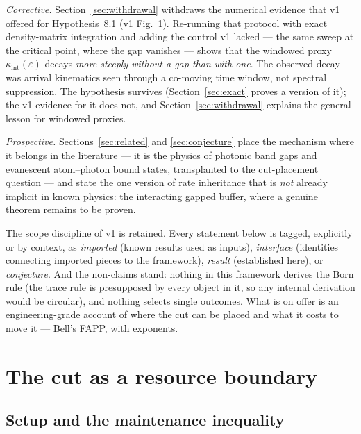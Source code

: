 \documentclass[11pt,a4paper]{article}
\theoremstyle{remark}
\newcommand{\eps}{\varepsilon}
\begin{document}
\emph{Corrective.} Section~\ref{sec:withdrawal} withdraws the numerical evidence that v1
offered for Hypothesis~8.1 (v1 Fig.~1). Re-running that protocol with exact density-matrix
integration and adding the control v1 lacked --- the same sweep at the critical point,
where the gap vanishes --- shows that the windowed proxy $\kappa_{\mathrm{int}}(\eps)$
decays \emph{more steeply without a gap than with one}. The observed decay was arrival
kinematics seen through a co-moving time window, not spectral suppression. The hypothesis
survives (Section~\ref{sec:exact} proves a version of it); the v1 evidence for it does not,
and Section~\ref{sec:withdrawal} explains the general lesson for windowed proxies.

\emph{Prospective.} Sections~\ref{sec:related} and \ref{sec:conjecture} place the mechanism
where it belongs in the literature --- it is the physics of photonic band gaps and
evanescent atom--photon bound states, transplanted to the cut-placement question --- and
state the one version of rate inheritance that is \emph{not} already implicit in known
physics: the interacting gapped buffer, where a genuine theorem remains to be proven.

The scope discipline of v1 is retained. Every statement below is tagged, explicitly or by
context, as \emph{imported} (known results used as inputs), \emph{interface} (identities
connecting imported pieces to the framework), \emph{result} (established here), or
\emph{conjecture}. And the non-claims stand: nothing in this framework derives the Born
rule (the trace rule is presupposed by every object in it, so any internal derivation would
be circular), and nothing selects single outcomes. What is on offer is an
engineering-grade account of where the cut can be placed and what it costs to move it ---
Bell's FAPP, with exponents.

\section{The cut as a resource boundary}
\label{sec:framework}

\subsection{Setup and the maintenance inequality}
\end{document}
